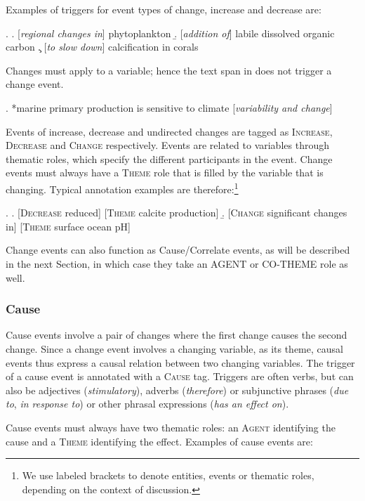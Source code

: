 \documentclass[10pt, a4paper]{article}
\newcommand{\tag}[1]{\textsc{#1}}
\begin{document}
Examples of triggers for event types of change, increase and decrease are:

\ex.
  \a. [\emph{regional changes in}] phytoplankton
  \b. [\emph{addition of}] labile dissolved organic carbon
  \c. [\emph{to slow down}] calcification in corals

Changes must apply to a variable; hence the text span in \Next does not trigger a change event.

\ex. *marine primary production is sensitive to climate [\emph{variability and change}]

Events of increase, decrease and undirected changes are tagged as \tag{Increase}, \tag{Decrease} and \tag{Change} respectively. 
Events are related to variables through thematic roles, which specify the different participants in the event. 
Change events must always have a \tag{Theme} role that is filled by the variable that is changing.
Typical annotation examples are therefore:\footnote{We use labeled brackets to denote entities, events or thematic roles, depending on the context of discussion.}

\exi.
  \a. [\tag{Decrease} reduced] [\tag{Theme} calcite production]
  \b. [\tag{Change} significant changes in] [\tag{Theme} surface ocean pH]

Change events can also function as Cause/Correlate events, as will be described in the next Section, in which case they take an AGENT or CO-THEME role as well.


\subsubsection{Cause}

Cause events involve a pair of changes where the first change causes the second change.
Since a change event involves a changing variable, as its theme, causal events thus express a causal relation between two changing variables. 
The trigger of a cause event is annotated with a \tag{Cause} tag.
Triggers are often verbs, but can also be adjectives (\emph{stimulatory}), adverbs (\emph{therefore}) or subjunctive phrases (\emph{due to}, \emph{in response to}) or other phrasal expressions (\emph{has an effect on}).  

Cause events must always have two thematic roles: an \tag{Agent} identifying the cause and a \tag{Theme} identifying the effect. 
Examples of cause events are:
\end{document}
